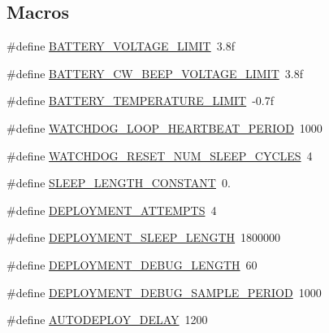 \subsection*{Macros}
\begin{DoxyCompactItemize}
\item 
\#define \hyperlink{group__defines__power__management__configuration_gab56ff9c956d5497736a78ad136ad42ce}{B\+A\+T\+T\+E\+R\+Y\+\_\+\+V\+O\+L\+T\+A\+G\+E\+\_\+\+L\+I\+M\+IT}~3.\+8f
\item 
\#define \hyperlink{group__defines__power__management__configuration_ga49ce03eb4bd79a0060a41d793a946a83}{B\+A\+T\+T\+E\+R\+Y\+\_\+\+C\+W\+\_\+\+B\+E\+E\+P\+\_\+\+V\+O\+L\+T\+A\+G\+E\+\_\+\+L\+I\+M\+IT}~3.\+8f
\item 
\#define \hyperlink{group__defines__power__management__configuration_gac16481577dc431a739e4a370c55ac31b}{B\+A\+T\+T\+E\+R\+Y\+\_\+\+T\+E\+M\+P\+E\+R\+A\+T\+U\+R\+E\+\_\+\+L\+I\+M\+IT}~-\/0.\+7f
\item 
\#define \hyperlink{group__defines__power__management__configuration_gab197bb7848461922d4807f622f8e1fa1}{W\+A\+T\+C\+H\+D\+O\+G\+\_\+\+L\+O\+O\+P\+\_\+\+H\+E\+A\+R\+T\+B\+E\+A\+T\+\_\+\+P\+E\+R\+I\+OD}~1000
\item 
\#define \hyperlink{group__defines__power__management__configuration_ga9cc0ca1764367faad6417786f2bf6c31}{W\+A\+T\+C\+H\+D\+O\+G\+\_\+\+R\+E\+S\+E\+T\+\_\+\+N\+U\+M\+\_\+\+S\+L\+E\+E\+P\+\_\+\+C\+Y\+C\+L\+ES}~4
\item 
\#define \hyperlink{group__defines__power__management__configuration_ga81e91715a5069cfc0e8c4e8abb09c7ca}{S\+L\+E\+E\+P\+\_\+\+L\+E\+N\+G\+T\+H\+\_\+\+C\+O\+N\+S\+T\+A\+NT}~0.
\item 
\#define \hyperlink{group__defines__power__management__configuration_ga5570f576c017a9d49eb716091e3e6831}{D\+E\+P\+L\+O\+Y\+M\+E\+N\+T\+\_\+\+A\+T\+T\+E\+M\+P\+TS}~4
\item 
\#define \hyperlink{group__defines__power__management__configuration_ga3f2ab6a21f83ae3f1af1c47852c31873}{D\+E\+P\+L\+O\+Y\+M\+E\+N\+T\+\_\+\+S\+L\+E\+E\+P\+\_\+\+L\+E\+N\+G\+TH}~1800000
\item 
\#define \hyperlink{group__defines__power__management__configuration_gab47513da7a20ecfdd6fecd60fcdba7b0}{D\+E\+P\+L\+O\+Y\+M\+E\+N\+T\+\_\+\+D\+E\+B\+U\+G\+\_\+\+L\+E\+N\+G\+TH}~60
\item 
\#define \hyperlink{group__defines__power__management__configuration_ga19207306df03c631116fc3f6edbd0295}{D\+E\+P\+L\+O\+Y\+M\+E\+N\+T\+\_\+\+D\+E\+B\+U\+G\+\_\+\+S\+A\+M\+P\+L\+E\+\_\+\+P\+E\+R\+I\+OD}~1000
\item 
\#define \hyperlink{group__defines__power__management__configuration_gaa44a203cdf6536532202678823a18542}{A\+U\+T\+O\+D\+E\+P\+L\+O\+Y\+\_\+\+D\+E\+L\+AY}~1200
\end{DoxyCompactItemize}


